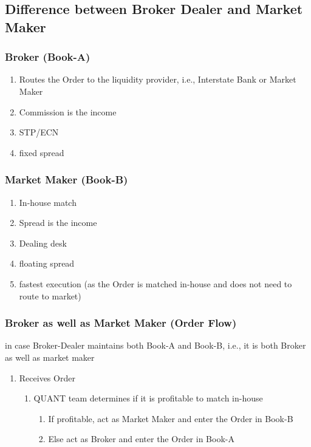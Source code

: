 \documentclass[11pt]{article}
\begin{document}
\subsection{Difference between Broker Dealer and Market Maker}
\label{sec:orgbe2c742}
\subsubsection{Broker (Book-A)}
\label{sec:orga3cf1d6}
\begin{enumerate}
\item Routes the Order to the liquidity provider, i.e., Interstate Bank or Market Maker
\label{sec:orgeb5f863}
\item Commission is the income
\label{sec:orgbb4e935}
\item STP/ECN
\label{sec:org8359d9b}
\item fixed spread
\label{sec:orga81d90f}
\end{enumerate}
\subsubsection{Market Maker (Book-B)}
\label{sec:org20f9f8a}
\begin{enumerate}
\item In-house match
\label{sec:org6eb25e5}
\item Spread is the income
\label{sec:orgae1bafa}
\item Dealing desk
\label{sec:orga792ca9}
\item floating spread
\label{sec:org55b8444}
\item fastest execution (as the Order is matched in-house and does not need to route to market)
\label{sec:org61aee12}
\end{enumerate}

\subsubsection{Broker as well as Market Maker (Order Flow)}
\label{sec:org8eefb13}
in case Broker-Dealer maintains both Book-A and Book-B, i.e., it is both Broker as well as market maker
\begin{enumerate}
\item Receives Order
\label{sec:org80c9749}
\begin{enumerate}
\item QUANT team determines if it is profitable to match in-house
\label{sec:org34f3994}
\begin{enumerate}
\item If profitable, act as Market Maker and enter the Order in Book-B
\label{sec:org9c5ff83}
\item Else act as Broker and enter the Order in Book-A
\label{sec:org2bada18}
\end{enumerate}
\end{enumerate}
\end{enumerate}
\end{document}
